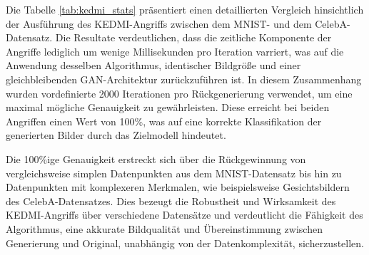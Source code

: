 \begin{table}[h]
	\centering
	\renewcommand{\arraystretch}{1.5}
	\caption{\glqq KEDMI\grqq-Angriffsstatistik}
	\label{tab:kedmi_stats}
\end{table}

Die Tabelle \ref{tab:kedmi_stats} präsentiert einen detaillierten Vergleich hinsichtlich der Ausführung des \glqq KEDMI\grqq-Angriffs zwischen dem MNIST- und dem CelebA-Datensatz. Die Resultate verdeutlichen, dass die zeitliche Komponente der Angriffe lediglich um wenige Millisekunden pro Iteration varriert, was auf die Anwendung desselben Algorithmus, identischer Bildgröße und einer gleichbleibenden GAN-Architektur zurückzuführen ist. In diesem Zusammenhang wurden vordefinierte 2000 Iterationen pro Rückgenerierung verwendet, um eine maximal mögliche Genauigkeit zu gewährleisten. Diese erreicht bei beiden Angriffen einen Wert von 100\%, was auf eine korrekte Klassifikation der generierten Bilder durch das Zielmodell hindeutet. 

Die 100\%ige Genauigkeit erstreckt sich über die Rückgewinnung von vergleichsweise simplen Datenpunkten aus dem MNIST-Datensatz bis hin zu Datenpunkten mit komplexeren Merkmalen, wie beispielsweise Gesichtsbildern des CelebA-Datensatzes. Dies bezeugt die Robustheit und Wirksamkeit des \glqq KEDMI\grqq-Angriffs über verschiedene Datensätze und verdeutlicht die Fähigkeit des Algorithmus, eine akkurate Bildqualität und Übereinstimmung zwischen Generierung und Original, unabhängig von der Datenkomplexität, sicherzustellen.

